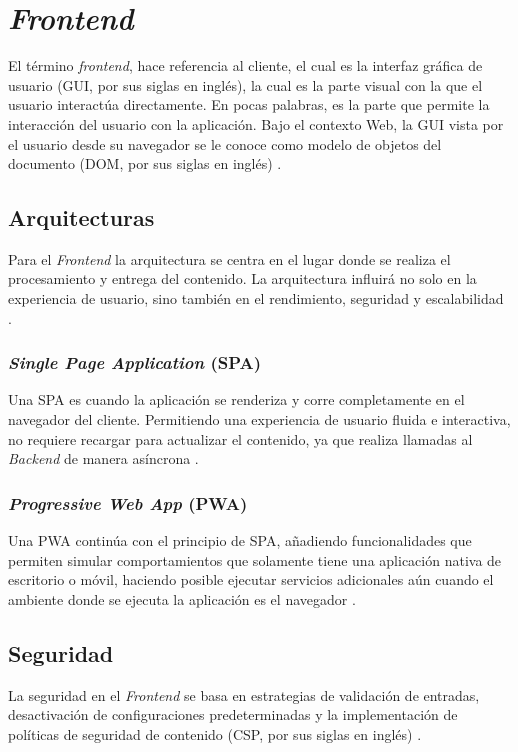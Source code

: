 \section{\textit{Frontend}}
El término \textit{\gls{frontend}}, hace referencia al cliente, el cual es la interfaz gráfica de usuario (GUI, por sus siglas en inglés),
la cual es la parte visual con la que el usuario interactúa directamente. En pocas palabras, es la parte que permite la
interacción del usuario con la aplicación. Bajo el contexto Web, la GUI vista por el usuario desde su navegador se le
conoce como modelo de objetos del documento (DOM, por sus siglas en inglés) \cite{aws2025frontendBackend}.

\subsection{Arquitecturas}
Para el \textit{Frontend} la arquitectura se centra en el lugar donde se realiza el procesamiento y entrega del contenido.
La arquitectura influirá no solo en la experiencia de usuario, sino también en el rendimiento, seguridad y escalabilidad
\cite{romero2021arquitectura}.

\subsubsection{\textit{Single Page Application} (SPA)}
Una SPA es cuando la aplicación se renderiza y corre completamente en el navegador del cliente. Permitiendo una experiencia
de usuario fluida e interactiva, no requiere recargar para actualizar el contenido, ya que realiza llamadas al \textit{Backend}
de manera asíncrona \cite{universidadElBosque2024arquitectura}.

\subsubsection{\textit{Progressive Web App} (PWA)}
Una PWA continúa con el principio de SPA, añadiendo funcionalidades que permiten simular comportamientos que solamente tiene
una aplicación nativa de escritorio o móvil, haciendo posible ejecutar servicios adicionales aún cuando el ambiente donde se
ejecuta la aplicación es el navegador \cite{universidadElBosque2024arquitectura}.

\subsection{Seguridad}
La seguridad en el \textit{Frontend} se basa en estrategias de validación de entradas, desactivación de configuraciones
predeterminadas y la implementación de políticas de seguridad de contenido (CSP, por sus siglas en inglés)
\cite{aws2025frontendBackend}.

